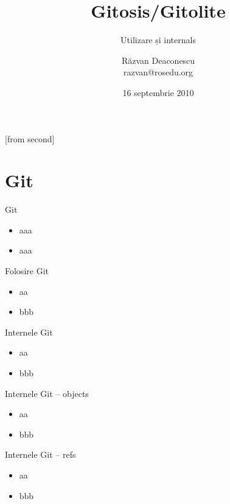\documentclass{beamer}
\title[Gitosis/Gitolite]{Gitosis/Gitolite}
\subtitle{Utilizare și internals}
\institute{Întâlnirile lunare RLUG -- Septembrie 2010}
\author[Răzvan Deaconescu]{Răzvan Deaconescu\\
	razvan@rosedu.org}
\date{16 septembrie 2010}
\begin{document}
[from second]


\frame{\titlepage}

\frame{\tableofcontents}

\section{Git}

\begin{frame}{Git}
	\begin{itemize}		%
		\item aaa
		\item aaa
	\end{itemize}
\end{frame}

\begin{frame}{Folosire Git}
	\begin{itemize}
		\item aa
		\item bbb
	\end{itemize}
\end{frame}

\begin{frame}{Internele Git}
	\begin{itemize}
		\item aa
		\item bbb
	\end{itemize}
\end{frame}

\begin{frame}{Internele Git -- objects}
	\begin{itemize}
		\item aa
		\item bbb
	\end{itemize}
\end{frame}

\begin{frame}{Internele Git -- refs}
	\begin{itemize}
		\item aa
		\item bbb
	\end{itemize}
\end{frame}
\end{document}
